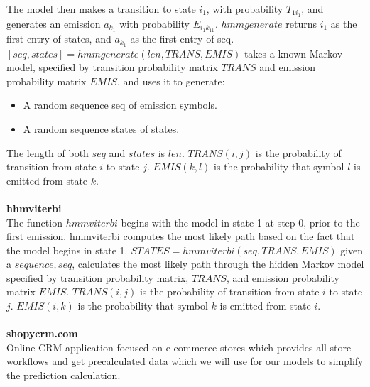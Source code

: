 The model then makes a transition to state $i_1$, with probability $T_{1i_1}$, and generates an emission $a_k_1$ with probability $E_{i_1k_11}$.
$hmmgenerate$ returns $i_1$ as the first entry of states, and $a_k_1$ as the first entry of seq.
$[seq,states] = hmmgenerate(len,TRANS,EMIS)$ takes a known Markov model, specified by transition probability matrix $TRANS$ and emission probability matrix $EMIS$,
and uses it to generate:\\
\begin{itemize}
    \item A random sequence seq of emission symbols.
    \item A random sequence states of states.
\end{itemize}
The length of both $seq$ and $states$ is $len$.
$TRANS(i,j)$ is the probability of transition from state $i$ to state $j$.
$EMIS(k,l)$ is the probability that symbol $l$ is emitted from state $k$.\\
\\
\textbf{hhmviterbi}~\cite{hhmviterbi}\\
The function $hmmviterbi$ begins with the model in state 1 at step 0, prior to the first emission.
hmmviterbi computes the most likely path based on the fact that the model begins in state 1.
$STATES = hmmviterbi(seq,TRANS,EMIS)$ given a $sequence, seq$, calculates the most likely path through the hidden Markov model
specified by transition probability matrix, $TRANS$, and emission probability matrix $EMIS$. $TRANS(i,j)$ is the probability of transition from state $i$ to state $j$.
$EMIS(i,k)$ is the probability that symbol $k$ is emitted from state $i$.\\
\\
\textbf{shopycrm.com}\\
Online CRM application focused on e-commerce stores which provides all store workflows and get precalculated data which
we will use for our models to simplify the prediction calculation.

